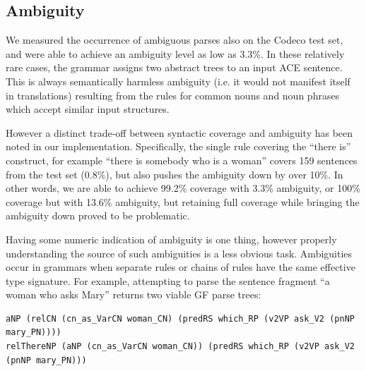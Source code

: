 \documentclass[a4paper]{article}
\begin{document}


\subsection{Ambiguity}
\label{subsection:ambiguity}

We measured the occurrence of ambiguous parses also on the Codeco test set,
and were able to achieve an ambiguity level as low as 3.3\%.
In these relatively rare cases, the grammar assigns two abstract trees
to an input ACE sentence. This is always semantically harmless ambiguity
(i.e. it would not manifest itself in translations) resulting from the rules
for common nouns and noun phrases which accept similar input structures.

However a distinct trade-off between syntactic coverage and ambiguity
has been noted in our implementation.  Specifically, the single rule
covering the ``there is'' construct, for example ``there is somebody
who is a woman'' covers 159 sentences from the test set (0.8\%), but
also pushes the ambiguity down by over 10\%. In other words, we are
able to achieve 99.2\% coverage with 3.3\% ambiguity, or 100\%
coverage but with 13.6\% ambiguity, but retaining full coverage while
bringing the ambiguity down proved to be problematic.


Having some numeric indication of ambiguity is one thing, however
properly understanding the source of such ambiguities is a less
obvious task. Ambiguities occur in grammars when separate rules or
chains of rules have the same effective type signature. For example,
attempting to parse the sentence fragment ``a woman who asks Mary''
returns two viable GF parse trees:

{\footnotesize
\begin{verbatim}
aNP (relCN (cn_as_VarCN woman_CN) (predRS which_RP (v2VP ask_V2 (pnNP mary_PN))))
relThereNP (aNP (cn_as_VarCN woman_CN)) (predRS which_RP (v2VP ask_V2 (pnNP mary_PN)))
\end{verbatim}
}
\end{document}
